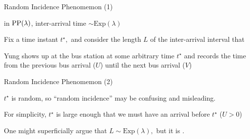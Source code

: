 \begin{frame}{Random Incidence Phenomemon (1)}

\plitemsep 0.1in

\bci

\item {} in $\text{PP}(\lambda)$, inter-arrival time $\sim \text{Exp}(\lambda)$ 

\item<2-> Fix a time instant $t^\star,$ and consider the length $L$ of the
  inter-arrival interval that 


\item<3->  Yung shows up at the bus station at some
  arbitrary time $t^\star$ and records the time from the previous bus
  arrival ($U$) until the next bus arrival ($V$)

\item<4-> \question {} \hfill {}
  
  \eci


\end{frame}

\begin{frame}{Random Incidence Phenomemon (2)}

\plitemsep 0.1in


\bci

\item<2-> $t^\star$ is  random, so ``random incidence'' may be
  confusing and misleading. 

  \item<3->  For simplicity, $t^\star$ is large enough that we must have
    an arrival before $t^\star$ ($U > 0$)

\item<4-> One might superficially argue that $L \sim
  \text{Exp}(\lambda),$ but it is . 
    \eci

\end{frame}

